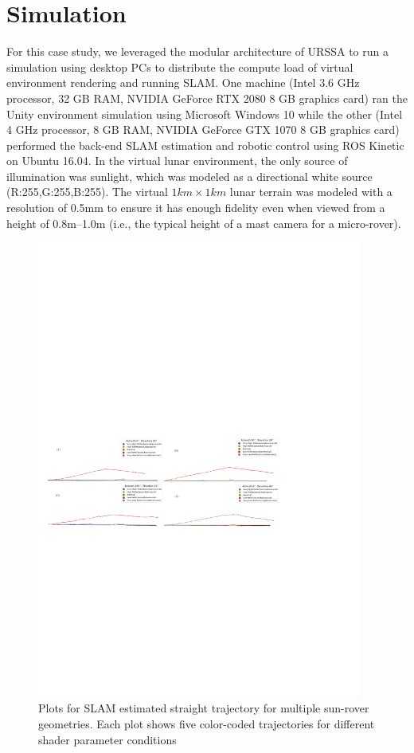 \documentclass[a4paper, 10pt, conference]{ieeeconf}      %
\begin{document}
\section{Simulation }
For this case study, we leveraged the modular architecture of URSSA to run a simulation using desktop PCs to distribute the compute load of virtual environment rendering and running SLAM. One machine (Intel 3.6 GHz processor, 32 GB RAM, NVIDIA GeForce RTX 2080 8 GB graphics card) ran the Unity environment simulation using Microsoft Windows 10 while the other (Intel 4 GHz processor, 8 GB RAM, NVIDIA GeForce GTX 1070 8 GB graphics card) performed the back-end SLAM estimation and robotic control using ROS Kinetic on Ubuntu 16.04. In the virtual lunar environment, the only source of illumination was sunlight, which was modeled as a directional white source (R:255,G:255,B:255). The virtual $1km\times 1km$ lunar terrain was modeled with a resolution of 0.5mm to ensure it has enough fidelity even when viewed from a height of 0.8m--1.0m (i.e., the typical height of a mast camera for a micro-rover).
\begin{figure}[!htb]
      \centering
        \includegraphics[width=0.95\textwidth]{Figures/straight_plots.pdf}
      \caption{Plots for SLAM estimated straight trajectory for multiple sun-rover geometries. Each plot shows five color-coded trajectories for different shader parameter conditions}
      \label{strght_plots}
\end{figure}
\end{document}
